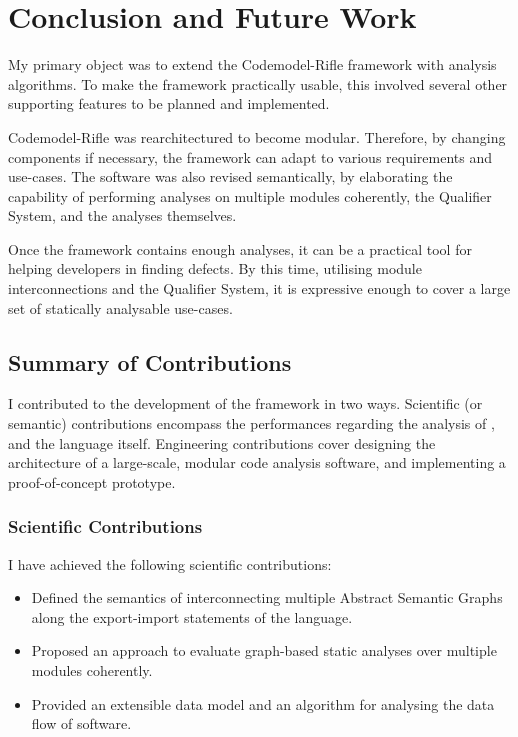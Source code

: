 \chapter{Conclusion and Future Work}
\label{chapter:conclusion}

My primary object was to extend the Codemodel-Rifle framework with analysis algorithms. To make the framework practically usable, this involved several other supporting features to be planned and implemented.

Codemodel-Rifle was rearchitectured to become modular. Therefore, by changing components if necessary, the framework can adapt to various requirements and use-cases. The software was also revised semantically, by elaborating the capability of performing analyses on multiple modules coherently, the Qualifier System, and the analyses themselves.

Once the framework contains enough analyses, it can be a practical tool for helping developers in finding defects. By this time, utilising module interconnections and the Qualifier System, it is expressive enough to cover a large set of statically analysable use-cases.


\section{Summary of Contributions}

I contributed to the development of the framework in two ways. Scientific (or semantic) contributions encompass the performances regarding the analysis of \es, and the language itself. Engineering contributions cover designing the architecture of a large-scale, modular code analysis software, and implementing a proof-of-concept prototype.


\subsection{Scientific Contributions}

I have achieved the following scientific contributions:

\begin{itemize}
\item Defined the semantics of interconnecting multiple Abstract Semantic Graphs along the export-import statements of the \es language.
\item Proposed an approach to evaluate graph-based static analyses over multiple \es modules coherently.
\item Provided an extensible data model and an algorithm for analysing the data flow of \es software.
\end{itemize}


